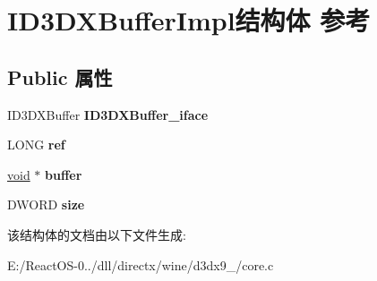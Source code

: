 \hypertarget{struct_i_d3_d_x_buffer_impl}{}\section{I\+D3\+D\+X\+Buffer\+Impl结构体 参考}
\label{struct_i_d3_d_x_buffer_impl}
\subsection*{Public 属性}
\begin{DoxyCompactItemize}
\item 
\mbox{\label{struct_i_d3_d_x_buffer_impl_afba61cc54153b793a0e4b9b0542e8f00}} 
I\+D3\+D\+X\+Buffer {\bfseries I\+D3\+D\+X\+Buffer\+\_\+iface}
\item 
\mbox{\label{struct_i_d3_d_x_buffer_impl_acde3c48f0ff0f9ecc46697f9cc9e951c}} 
L\+O\+NG {\bfseries ref}
\item 
\mbox{\label{struct_i_d3_d_x_buffer_impl_a2a21ff0e125a72e1235ff75d2a0c4646}} 
\hyperlink{interfacevoid}{void} $\ast$ {\bfseries buffer}
\item 
\mbox{\label{struct_i_d3_d_x_buffer_impl_a41181a786bf08b90c25da8335332aafa}} 
D\+W\+O\+RD {\bfseries size}
\end{DoxyCompactItemize}


该结构体的文档由以下文件生成\+:\begin{DoxyCompactItemize}
\item 
E\+:/\+React\+O\+S-\/0../dll/directx/wine/d3dx9\+\_/core.\+c\end{DoxyCompactItemize}
